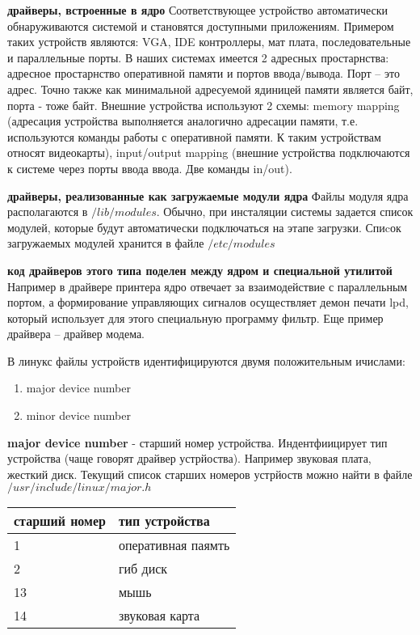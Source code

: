 \textbf {драйверы, встроенные в ядро} Соответствующее устройство автоматически обнаруживаются системой и становятся доступными приложениям. Примером таких устройств являются: VGA, IDE контроллеры, мат плата, последовательные и параллельные порты. В наших системах имеется 2 адресных простарнства: адресное простарнство оперативной памяти и портов ввода/вывода. Порт – это адрес. Точно также как минимальной адресуемой ядиницей памяти является байт, порта - тоже байт.  Внешние устройства используют 2 схемы: memory mapping (адресация устройства выполняется аналогично адресации памяти, т.е. используются команды работы с оперативной памяти. К таким устройствам относят видеокарты), input/output mapping (внешние устройства подключаются к системе через порты ввода ввода. Две команды in/out).

\textbf {драйверы, реализованные как загружаемые модули ядра} Файлы модуля ядра располагаются в $/lib/modules$. Обычно, при инсталяции системы задается список модулей, которые будут автоматически подключаться на этапе загрузки. Спиcок загружаемых модулей хранится в файле $/etc/modules$

\textbf {код  драйверов этого типа поделен между ядром и специальной утилитой} Например в драйвере принтера ядро отвечает за взаимодействие с параллельным портом, а формирование управляющих сигналов осуществляет демон печати lpd, который использует для этого специальную программу фильтр. Еще пример драйвера – драйвер модема.

В линукс файлы устройств идентифицируются двумя положительным ичислами:
\begin{enumerate}
	\item major device number
	\item minor device number
\end{enumerate}

\textbf {major device number} - старший номер устройства. Индентфиицирует тип устройства (чаще говорят драйвер устрйоства). Например звуковая плата, жесткий диск. Текущий список старших номеров устрйоств можно найти в файле $/usr/include/linux/major.h$

\begin{table}[H]
\begin{tabular}{|l|l|}
\hline
старший номер & тип устройства\\
\hline
1 & оперативная паямть \\
2 & гиб диск \\
13 & мышь \\
14 & звуковая карта\\
\hline
\end{tabular}
\end{table}

